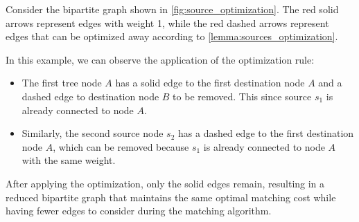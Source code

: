 \begin{example}
    Consider the bipartite graph shown in \cref{fig:source_optimization}. The red solid arrows represent edges with weight 1, while the red dashed arrows represent edges that can be optimized away according to \cref{lemma:sources_optimization}.

    In this example, we can observe the application of the optimization rule:
    \begin{itemize}
        \item The first tree node $A$ has a solid edge to the first destination node $A$ and a dashed edge to destination node $B$ to be removed. This since source $s_1$ is already connected to node $A$.
        \item Similarly, the second source node $s_2$ has a dashed edge to the first destination node $A$, which can be removed because $s_1$ is already connected to node $A$ with the same weight.
    \end{itemize}

    After applying the optimization, only the solid edges remain, resulting in a reduced bipartite graph that maintains the same optimal matching cost while having fewer edges to consider during the matching algorithm.
    \begin{figure}[H]
        \centering
\end{figure}
\end{example}
